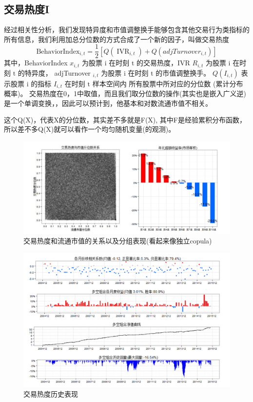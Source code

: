 \documentclass[12pt]{article}
\begin{document}
\subsection{交易热度I}
经过相关性分析，我们发现特异度和市值调整换手能够包含其他交易行为类指标的所有信息，我们利用加总分位数的方式合成了一个新的因子，叫做交易热度
$$ 
\text{BehaviorIndex}_{i, t}=\frac{1}{2}\left[Q\left(\operatorname{IVR}_{i, t}\right)+Q\left( adjTurnover_{i, t}\right)\right]
$$
其中，BehaviorIndex $x_{i, t}$ 为股票 $\mathrm{i}$ 在时刻 $\mathrm{t}$ 的交易热度，IVR $R_{i, t}$ 为股票 $\mathrm{i}$ 在时刻 $\mathrm{t}$ 的特异度， adjTurnover $_{i, t}$ 为股票 $\mathrm{i}$ 在时刻 $\mathrm{t}$ 的市值调整换手。 $Q\left(I_{i, t}\right)$ 表示股票 $\mathrm{i}$ 的指标 $I_{i, t}$ 在时刻 $\mathrm{t}$ 样本空间内 所有股票中所对应的分位数 (累计分布概率)。
交易热度在0，1中取值，而且我们取分位数的操作(其实也是嵌入广义逆)是一个单调变换，，因此可以预计到，他基本和对数流通市值不相关。
\begin{sremark}{}{}
这个Q(X)，代表X的分位数，其实差不多就是F(X), 其中F是经验累积分布函数，所以差不多Q(X)就可以看作一个均匀随机变量(的观测)。	
\end{sremark}
\begin{figure}[htb]
	\centering
	\includegraphics[scale=0.5]{figure/交易热度1.pic.jpg}
	\caption{交易热度和流通市值的关系以及分组表现(看起来像独立copula)}
\end{figure}

\begin{figure}[htb]
	\centering
	\includegraphics[scale=0.5]{figure/交易热度1历史表现.png}
	\caption{交易热度历史表现}
\end{figure}
\end{document}
